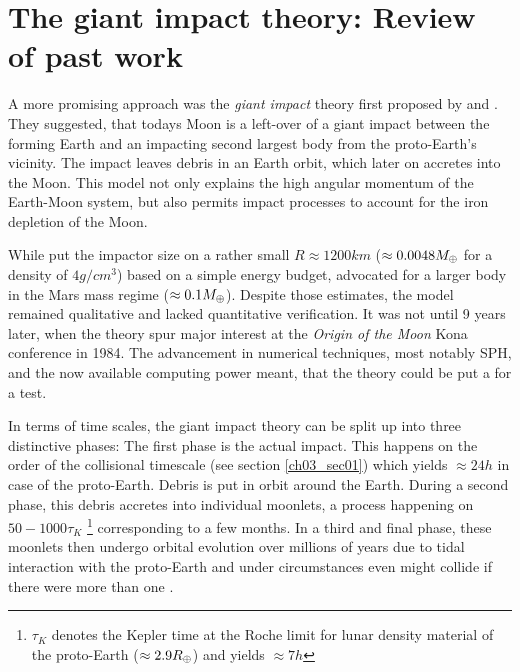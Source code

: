 \section{The giant impact theory: Review of past work}
A more promising approach was the \emph{giant impact} theory first proposed by \cite{1975Icar...24..504H} and \cite{1976LPI.....7..120C}. They suggested, that todays Moon is a left-over of a giant impact between the forming Earth and an impacting second largest body from the proto-Earth's vicinity. The impact leaves debris in an Earth orbit, which later on accretes into the Moon. This model not only explains the high angular momentum of the Earth-Moon system, but also permits impact processes to account for the iron depletion of the Moon.

While \cite{1975Icar...24..504H} put the impactor size on a rather small $R \approx 1200km$ ($\approx 0.0048 M_{\oplus}$ for a density of $4 g/cm^3$) based on a simple energy budget, \cite{1976LPI.....7..120C} advocated for a larger body in the Mars mass regime ($\approx 0.1 M_{\oplus}$). Despite those estimates, the model remained qualitative and lacked quantitative verification. It was not until 9 years later, when the theory spur major interest at the \emph{Origin of the Moon} Kona conference in 1984. The advancement in numerical techniques, most notably SPH, and the now available computing power meant, that the theory could be put a for a test. 

In terms of time scales, the giant impact theory can be split up into three distinctive phases: The first phase is the actual impact. This happens on the order of the collisional timescale (see section \ref{ch03_sec01}) which yields $\approx 24h$ in case of the proto-Earth. Debris is put in orbit around the Earth. During a second phase, this debris accretes into individual moonlets, a process happening on $50 - 1000 \tau_K$ \footnote{$\tau_K$ denotes the Kepler time at the Roche limit for lunar density material of the proto-Earth ($\approx 2.9 R_{\oplus}$) and yields $\approx 7h$} corresponding to a few months. In a third and final phase, these moonlets then undergo orbital evolution over millions of years due to tidal interaction with the proto-Earth and under circumstances even might collide if there were more than one \cite{Canup:1996p3541}.

